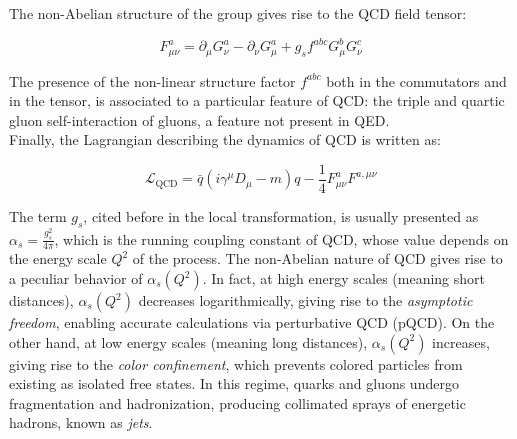 \noindent The non-Abelian structure of the group gives rise to the QCD field tensor:

\begin{equation}\label{eq:SM_BSM/QCD/QCD_tensor}
    F_{\mu\nu}^a = \partial_\mu G_\nu^a - \partial_\nu G_\mu^a + g_s f^{abc} G_\mu^b G_\nu^c
\end{equation}

\noindent The presence of the non-linear structure factor $f^{abc}$ both in the commutators and in the tensor, is associated to a particular feature of QCD: the triple and quartic gluon self-interaction of gluons, a feature not present in QED.\\
Finally, the Lagrangian describing the dynamics of QCD is written as:

\begin{equation}\label{eq:SM_BSM/QCD/QCD_L}
    \mathcal{L}_\text{QCD} =  \bar{q} \left( i \gamma^\mu D_\mu - m \right) q - \frac{1}{4} F_{\mu\nu}^a F^{a, \mu\nu}
\end{equation}

\noindent The term $g_s$, cited before in the local transformation, is usually presented as $\alpha_s = \frac{g_s^2}{4\pi}$, which is the running coupling constant of QCD, whose value depends on the energy scale $Q^2$ of the process. The non-Abelian nature of QCD gives rise to a peculiar behavior of $\alpha_s(Q^2)$.
In fact, at high energy scales (meaning short distances), $\alpha_s(Q^2)$ decreases logarithmically,  giving rise to the \textit{asymptotic freedom}, enabling accurate calculations via perturbative QCD (pQCD). On the other hand, at low energy scales (meaning long distances), $\alpha_s(Q^2)$ increases, giving rise to the \textit{color confinement}, which prevents colored particles from existing as isolated free states. In this regime, quarks and gluons undergo fragmentation and hadronization, producing collimated sprays of energetic hadrons, known as \textit{jets}.\\

